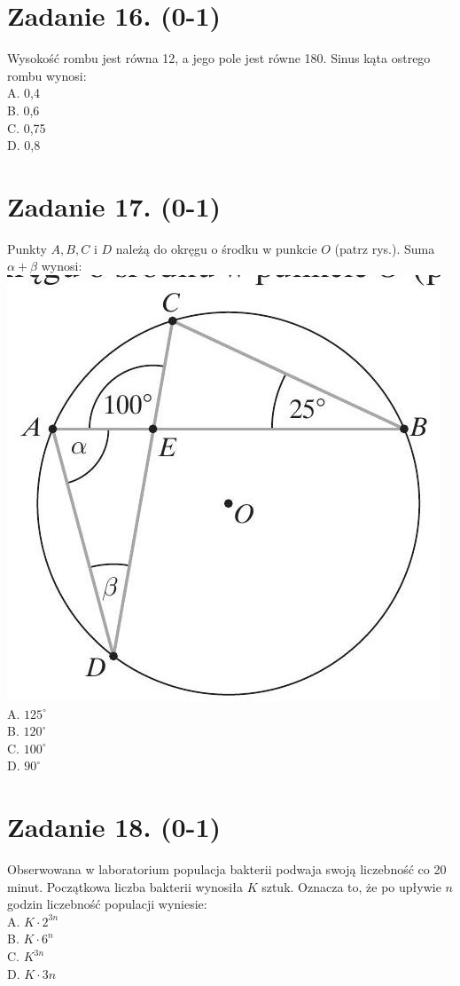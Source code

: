 \documentclass[10pt]{article}
\begin{document}
\section*{Zadanie 16. (0-1)}
Wysokość rombu jest równa 12, a jego pole jest równe 180. Sinus kąta ostrego rombu wynosi:\\
A. 0,4\\
B. 0,6\\
C. 0,75\\
D. 0,8

\section*{Zadanie 17. (0-1)}
Punkty \(A, B, C\) i \(D\) należą do okręgu o środku w punkcie \(O\) (patrz rys.). Suma \(\alpha+\beta\) wynosi:\\
\includegraphics[max width=\textwidth, center]{2024_11_21_724abc2cf5a71562f5b2g-06}\\
A. \(125^{\circ}\)\\
B. \(120^{\circ}\)\\
C. \(100^{\circ}\)\\
D. \(90^{\circ}\)

\section*{Zadanie 18. (0-1)}
Obserwowana w laboratorium populacja bakterii podwaja swoją liczebność co 20 minut. Początkowa liczba bakterii wynosiła \(K\) sztuk. Oznacza to, że po upływie \(n\) godzin liczebność populacji wyniesie:\\
A. \(K \cdot 2^{3 n}\)\\
B. \(K \cdot 6^{n}\)\\
C. \(K^{3 n}\)\\
D. \(K \cdot 3 n\)
\end{document}
